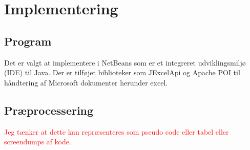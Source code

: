 \chapter{Implementering}

\section{Program}
Det er valgt at implementere i NetBeans som er et integreret udviklingsmiljø (IDE) til Java. Der er tilføjet biblioteker som JExcelApi og Apache POI til håndtering af Microsoft dokumenter herunder excel.

\section{Præprocessering}
\textcolor{red}{Jeg tænker at dette kan repræsenteres som pseudo code eller tabel eller screendumps af kode.} 

